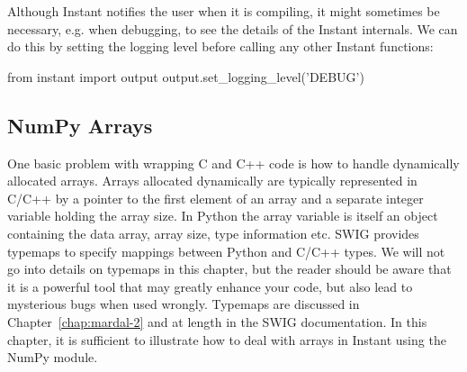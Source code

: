 
Although Instant notifies the user when it is compiling, it might
sometimes be necessary, e.g. when debugging, to see the details of the Instant
internals. We can do this by setting the logging level before calling any
other Instant functions:
\begin{python}
from instant import output
output.set_logging_level('DEBUG')
\end{python}

\subsection{NumPy Arrays}
One basic problem with wrapping C and C++ code is how to handle dynamically
allocated arrays. Arrays allocated
dynamically are typically represented in C/C++ by a pointer to the first element
of an array and a separate integer variable holding the array size. In Python
the array variable is itself an object containing the data array, array size,
type information etc. 
SWIG provides typemaps to specify  mappings between Python and C/C++ types. We
will not go into details on typemaps in this chapter, but the reader
should be aware that it is a powerful tool that may greatly enhance your
code, but also lead to mysterious bugs when used wrongly. Typemaps
are discussed in Chapter~\ref{chap:mardal-2} and at length in the SWIG documentation.
In this chapter, it is sufficient to illustrate how to deal
with arrays in Instant using the NumPy module. 

